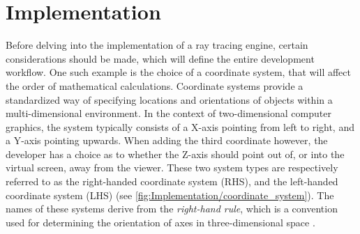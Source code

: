 
\chapter{Implementation} \label{ch:Implementation}

Before delving into the implementation of a ray tracing engine, certain considerations should be made, which will define the entire development workflow.
One such example is the choice of a coordinate system, that will affect the order of mathematical calculations.
Coordinate systems provide a standardized way of specifying locations and orientations of objects within a multi-dimensional environment.
In the context of two-dimensional computer graphics, the system typically consists of a X-axis pointing from left to right, and a Y-axis pointing upwards.
When adding the third coordinate however, the developer has a choice as to whether the Z-axis should point out of, or into the virtual screen, away from the viewer.
These two system types are respectively referred to as the right-handed coordinate system (RHS), and the left-handed coordinate system (LHS) (see \cref{fig:Implementation/coordinate_system}).
The names of these systems derive from the \textit{right-hand rule}, which is a convention used for determining the orientation of axes in three-dimensional space \supercite{RightHandRule}. 

